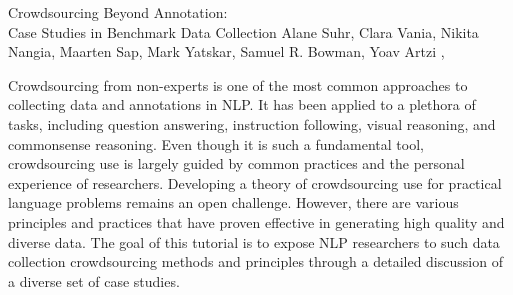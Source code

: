 \begin{tutorial}
  {Crowdsourcing Beyond Annotation: \\
  Case Studies in Benchmark Data Collection}
  {Alane Suhr, Clara Vania, Nikita Nangia, Maarten Sap, Mark Yatskar, Samuel R. Bowman, Yoav Artzi}
  {\daydateyear, \tutorialmorningtime}


Crowdsourcing from non-experts is one of the most common approaches to collecting data and annotations in NLP. It has been applied to a plethora of tasks, including question answering, instruction following, visual reasoning, and commonsense reasoning. Even though it is such a fundamental tool, crowdsourcing use is largely guided by common practices and the personal experience of researchers. Developing a theory of crowdsourcing use for practical language problems remains an open challenge. However, there are various principles and practices that have proven effective in generating high quality and diverse data. The goal of this tutorial is to expose NLP researchers to such data collection crowdsourcing methods and principles through a detailed discussion of a diverse set of case studies.

\end{tutorial}